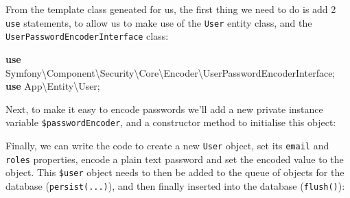 \documentclass[a4paperpaper,openright]{book}
\newenvironment{Shaded}{}{}
\newcommand{\FunctionTok}[1]{\textcolor[rgb]{0.02,0.16,0.49}{#1}}
\newcommand{\KeywordTok}[1]{\textcolor[rgb]{0.00,0.44,0.13}{\textbf{#1}}}
\newcommand{\NormalTok}[1]{#1}
\newcommand{\OtherTok}[1]{\textcolor[rgb]{0.00,0.44,0.13}{#1}}
\begin{document}
From the template class geneated for us, the first thing we need to do
is add 2 \texttt{use} statements, to allow us to make use of the
\texttt{User} entity class, and the
\texttt{UserPasswordEncoderInterface} class:

\begin{Shaded}
\begin{Highlighting}[]
    \KeywordTok{use}\NormalTok{ Symfony\textbackslash{}Component\textbackslash{}Security\textbackslash{}Core\textbackslash{}Encoder\textbackslash{}UserPasswordEncoderInterface}\OtherTok{;}
    \KeywordTok{use}\NormalTok{ App\textbackslash{}Entity\textbackslash{}User}\OtherTok{;}        
\end{Highlighting}
\end{Shaded}

Next, to make it easy to encode passwords we'll add a new private
instance variable \texttt{\$passwordEncoder}, and a constructor method
to initialise this object:

\begin{Shaded}
\end{Shaded}

Finally, we can write the code to create a new \texttt{User} object, set
its \texttt{email} and \texttt{roles} properties, encode a plain text
password and set the encoded value to the object. This \texttt{\$user}
object needs to then be added to the queue of objects for the database
(\texttt{persist(...)}), and then finally inserted into the database
(\texttt{flush()}):
\end{document}
